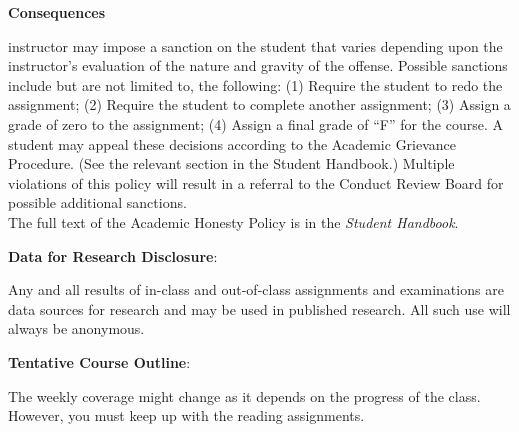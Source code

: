 \documentclass[11pt]{article}
\begin{document}
\textbf{Consequences}

\hspace{3mm}
\hangindent=5mm  \An instructor may impose a sanction on the student that varies depending upon the instructor's evaluation of the nature and gravity of the offense.  Possible sanctions include but are not limited to, the following: (1) Require the student to redo the assignment; (2) Require the student to complete another assignment; (3) Assign a grade of zero to the assignment; (4) Assign a final grade of ``F'' for the course. A student may appeal these decisions according to the Academic Grievance Procedure. (See the relevant section in the Student Handbook.) Multiple violations of this policy will result in a referral to the Conduct Review Board for possible additional sanctions. \\

The full text of the Academic Honesty Policy is in the \emph{Student Handbook}.

\textbf {\large Data for Research Disclosure}:

Any and all results of in-class and out-of-class assignments and examinations are data sources for research and may be used in published research. All such use will always be anonymous.

\newpage

\textbf {\large Tentative Course Outline}:

The weekly coverage might change as it depends on the progress of the class.  However, you must keep up with the reading assignments.
\end{document}
